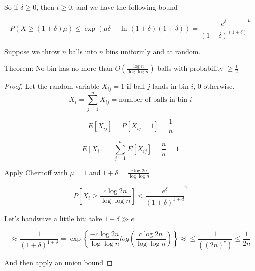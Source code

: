 \documentclass[../notes.tex]{subfiles}
\begin{document}
So if $ \delta \ge 0  $, then $ t \ge 0 $, and we have the following bound

\begin{equation}
    P(X \ge  (1+\delta)\mu) \le  \exp \left( \mu \delta - \ln (1+\delta) (1+\delta) \right)  = \frac{e^\delta}{(1+\delta)^{(1+\delta)}}^\mu
\end{equation}



\begin{example}
    Suppose we throw $ n $ balls into $ n $ bins uniformly and at random.

\begin{theorem}
Theorem: No bin has no more than $ O(\frac{\log n}{ \log \log n }) $ balls with probability $ \ge  \frac{1}{2} $
\end{theorem}


\begin{proof}

Let the random variable $ X_{ij} = 1 $ if ball $ j $ lands in bin $ i $, $ 0 $ otherwise.
\begin{equation}
    X_{i} = \sum^n_{j=1} X_{ij} = \text{number of balls in bin } i
\end{equation}

\begin{equation}
    E[X_{ij}] = P[X_{ij} = 1] = \frac{1}{n}
\end{equation}

\begin{equation}
    E[X_i] = \sum^n_{j=1} E[X_{ij}] = \frac{n}{n} = 1
\end{equation} 


Apply Chernoff with $ \mu = 1 $ and $ 1+\delta = \frac{c \log 2n}{ \log \log n } $

\begin{equation}
    P[X_i \ge   \frac{c \log 2n}{ \log \log n }] \le \frac{e^\delta}{(1+\delta)^{1+d}}^1
\end{equation}


Let's handwave a little bit: take $ 1+\delta \gg e $ 

\begin{equation}
    \approx \frac{1}{(1+\delta)^{1+\delta}} = \exp \left\{ \frac{-c \log 2n}{\log \log n} 
        log \left( \frac{c \log 2n}{\log \log n} \right) \right\}
    \approx \le \frac{1}{((2n)^c)} \le  \frac{1}{2n}
\end{equation}


And then apply an union bound



    
\end{proof}

\end{example}
\end{document}
